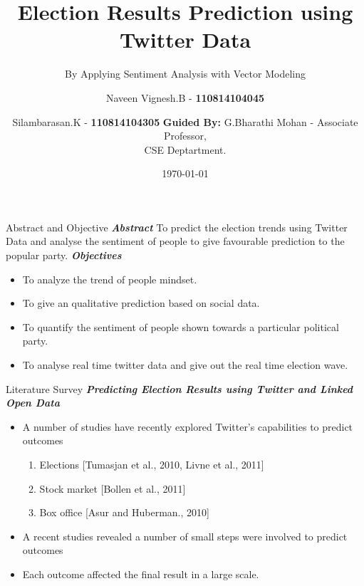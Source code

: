 \documentclass{beamer}
\author[Naveen Vignesh.B, Silamabarasan.K]{
	 Naveen Vignesh.B -
	\textbf{110814104045}\\
	\and
	Silambarasan.K - 
	\textbf{110814104305}
	\newline \newline
	\textbf{Guided By:} G.Bharathi Mohan - Associate Professor, \\
	CSE Deptartment.
}
\institute[]{ \textbf{Jaya Engineering College}}
\title[Twitter Based Election Prediction]{ Election Results Prediction using Twitter Data}
\subtitle{By Applying Sentiment Analysis with Vector Modeling}
\date{\today}
\begin{document}
\titlepage
\begin{frame}{Abstract and Objective}
	\textbf{\textit{Abstract}} \newline
      To predict the election trends using Twitter Data and analyse the sentiment of people to give favourable prediction to the popular party.
	\newline \newline
	\textbf{\textit{Objectives}}	   
	\begin{itemize}
		\item To analyze the trend of people mindset.
		\item To give an qualitative prediction based on social data.
		\item To quantify the sentiment of people shown towards a particular political party.
		\item To analyse real time twitter data and give out the real time election wave.
	\end{itemize}
	
\end{frame}

\begin{frame}{Literature Survey}
	\textbf{\textit{Predicting Election Results using Twitter and Linked Open Data}} \newline\
	\begin{itemize}
		\item A number of studies have recently explored Twitter's capabilities to predict outcomes
		\begin{enumerate}
			\item Elections [Tumasjan et al., 2010, Livne et al., 2011]
			\item Stock market [Bollen et al., 2011]
			\item Box office [Asur and Huberman., 2010]
		\end{enumerate}
	\item A recent studies revealed a number of small steps were involved to predict outcomes
	\item Each outcome affected the final result in a large scale.
	\end{itemize}
\end{frame}
\end{document}
